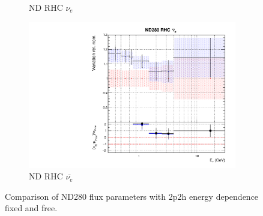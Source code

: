 \begin{figure}
\begin{subfigure}{0.45\textwidth}
  \caption{ND RHC $\nu_{e}$}
\end{subfigure}
\begin{subfigure}{0.45\textwidth}
  \centering
  \includegraphics[width=0.75\linewidth]{figs/fixed2p2hflux7}
  \caption{ND RHC $\bar{\nu_e}$}
\end{subfigure}
\caption{Comparison of ND280 flux parameters with 2p2h energy dependence fixed and free.}
\label{fig:fixed2p2hfluxND}
\end{figure}

